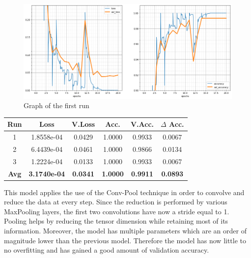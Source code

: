 \begin{figure}[H]
	\begin{center}
	\includegraphics[width=\linewidth]{Immagini/conv-pool-1}
	\caption{Graph of the first run}
	\end{center}
\end{figure}
\begin{table}[H]
	\centering
	\begin{tabular}{cccccc}
		\textbf{Run} &\textbf{Loss}&\textbf{V.Loss} &\textbf{Acc.}&\textbf{V.Acc.}&\textbf{$\Delta$ Acc.} \\ \hline
		1   & 1.8558e-04 &  0.0429  & 1.0000    & 0.9933    & 0.0067\\
		2   & 6.4439e-04 &  0.0461  & 1.0000    & 0.9866    & 0.0134\\
		3   & 1.2224e-04 &  0.0133  & 1.0000    & 0.9933    & 0.0067\\
		\textbf{Avg} & \textbf{3.1740e-04} &  \textbf{0.0341}  & \textbf{1.0000}    & \textbf{0.9911}    & \textbf{0.0893}
	\end{tabular}
\end{table}

This model applies the use of the Conv-Pool technique in order to convolve and reduce the data at every step. Since the reduction is performed by various MaxPooling layers, the first two convolutions have now a stride equal to 1. Pooling helps by reducing the tensor dimension while retaining most of its information. 
Moreover, the model has multiple parameters which are an order of magnitude lower than the previous model. Therefore the model has now little to no overfitting and has gained a good amount of validation accuracy.